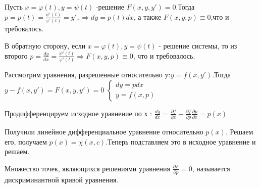 \documentclass[document.tex]{subfiles}
\begin{document}
Пусть $x=\varphi(t),y=\psi(t)$ -решение $F(x,y,y')=0$.Тогда $p=p(t)=\frac{\psi'(t)}{\varphi'(t)}=y'_x\Rightarrow dy=p(t)dx$, а также $F(x,y,p)\equiv 0$,что и требовалось.

В обратную сторону, если $x=\varphi(t),y=\psi(t)$ - решение системы, то из второго $p=\frac{dy}{dx}=\frac{\psi'(t)}{\varphi'(t)}\Rightarrow F(x,y,p)\equiv 0$, что и требовалось.
\begin{example}
Рассмотрим уравнения, разрешенные относительно y:$y=f(x,y')$.Тогда $y-f(x,y')=F(x,y,y')=0$
$
\left\{\begin{aligned}dy=pdx\\y=f(x,p) \end{aligned}\right.$

Продифференцируем исходное уравнение по х :
$\frac{dy}{dx}=\frac{\partial f}{\partial x} + \frac{\partial f}{\partial p}\frac{\partial p}{\partial x} = p(x)$

Получили линейное дифференциальное уравнение относительно $p(x)$. Решаем его, получаем $p(x)=\chi(x,c)$.Теперь подставляем это в исходное уравнение и решаем.
\end{example}
\begin{definition}
Множество точек, являющихся решениями уравнения $\frac{\partial F}{\partial p}=0$, называется дискриминантной кривой уравнения.
\end{definition}
\end{document}
